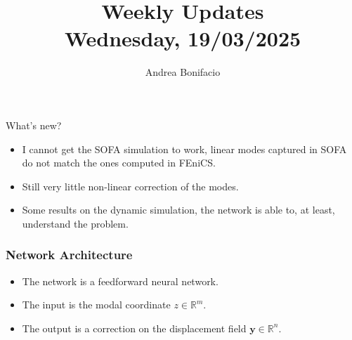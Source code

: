 \documentclass{beamer}
\title{Weekly Updates\\
\tiny{Wednesday, 19/03/2025}}
\author{Andrea Bonifacio}
\date{}
\begin{document}
\begin{frame}
\titlepage
\end{frame}


\begin{frame}{What's new?}
    \begin{itemize}
        \item I cannot get the SOFA simulation to work, linear modes captured in SOFA do not match the ones computed in FEniCS.
        \item Still very little non-linear correction of the modes.
        \item Some results on the dynamic simulation, the network is able to, at least, understand the problem.
    \end{itemize}
\end{frame}


\begin{frame}
    \frametitle{Network Architecture}
    \begin{itemize}
        \item The network is a feedforward neural network.
        \item The input is the modal coordinate \( z \in \mathbb{R}^m \).
        \item The output is a correction on the displacement field \( \mathbf{y} \in \mathbb{R}^n \).
    \end{itemize}



\begin{center}
        
\end{center}
    
\end{frame}
\end{document}
